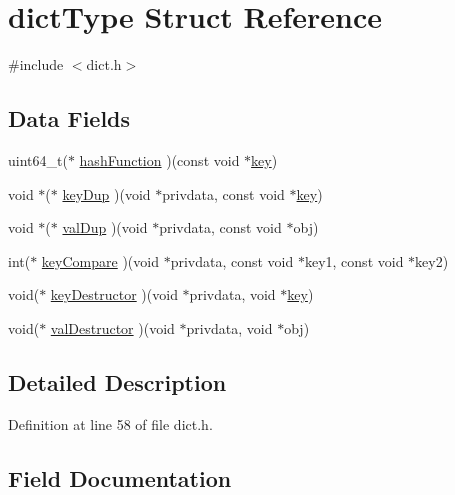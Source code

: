 \hypertarget{structdict_type}{}\section{dict\+Type Struct Reference}
\label{structdict_type}


{\ttfamily \#include $<$dict.\+h$>$}

\subsection*{Data Fields}
\begin{DoxyCompactItemize}
\item 
uint64\+\_\+t($\ast$ \hyperlink{structdict_type_a5811d50ea6030aac37ddc86d8fbc9a60}{hash\+Function} )(const void $\ast$\hyperlink{redis-check-rdb_8c_adc0ee0ed345db513fb6fac27511be4f1}{key})
\item 
void $\ast$($\ast$ \hyperlink{structdict_type_a2dd82eb7e0e1186bb12e07019818e4c0}{key\+Dup} )(void $\ast$privdata, const void $\ast$\hyperlink{redis-check-rdb_8c_adc0ee0ed345db513fb6fac27511be4f1}{key})
\item 
void $\ast$($\ast$ \hyperlink{structdict_type_a62279ffb4ad0b5054041285dbe54395f}{val\+Dup} )(void $\ast$privdata, const void $\ast$obj)
\item 
int($\ast$ \hyperlink{structdict_type_af973749ac3c53be917942afd20eeea0e}{key\+Compare} )(void $\ast$privdata, const void $\ast$key1, const void $\ast$key2)
\item 
void($\ast$ \hyperlink{structdict_type_a55bd09e65ce2b078c4d292dba93c8714}{key\+Destructor} )(void $\ast$privdata, void $\ast$\hyperlink{redis-check-rdb_8c_adc0ee0ed345db513fb6fac27511be4f1}{key})
\item 
void($\ast$ \hyperlink{structdict_type_adcae86192e4646f56c473a7e64fed530}{val\+Destructor} )(void $\ast$privdata, void $\ast$obj)
\end{DoxyCompactItemize}


\subsection{Detailed Description}


Definition at line 58 of file dict.\+h.



\subsection{Field Documentation}
\mbox{\label{structdict_type_a5811d50ea6030aac37ddc86d8fbc9a60}} 
